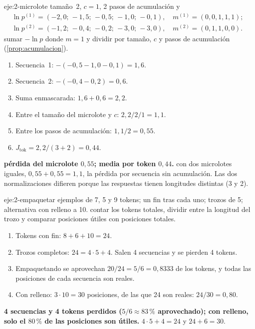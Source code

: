 \begin{solucion}{eje:2-microlote}
\datos tamaño~2, $c=1$, 2 pasos de acumulación y
\begin{gather*}
\ln p^{(1)}=(-2{,}0;\,-1{,}5;\,-0{,}5;\,-1{,}0;\,-0{,}1),\quad m^{(1)}=(0,0,1,1,1);\\
\ln p^{(2)}=(-1{,}2;\,-0{,}4;\,-0{,}2;\,-3{,}0;\,-3{,}0),\quad m^{(2)}=(0,1,1,0,0).
\end{gather*}
\planteamiento sumar $-\ln p$ donde $m=1$ y dividir por tamaño, $c$ y pasos de acumulación (\cref{prop:acumulacion}).
\pasos
\begin{enumerate}[label=\arabic*.]
  \item Secuencia~1: $-(-0{,}5-1{,}0-0{,}1)=1{,}6$.
  \item Secuencia~2: $-(-0{,}4-0{,}2)=0{,}6$.
  \item Suma enmascarada: $1{,}6+0{,}6=2{,}2$.
  \item Entre el tamaño del microlote y $c$: $2{,}2/2/1=1{,}1$.
  \item Entre los pasos de acumulación: $1{,}1/2=0{,}55$.
  \item $J_{\mathrm{tok}}=2{,}2/(3+2)=0{,}44$.
\end{enumerate}
\resultado \textbf{pérdida del microlote $0{,}55$; media por token $0{,}44$.}
\comprobacion con dos microlotes iguales, $0{,}55+0{,}55=1{,}1$, la pérdida por secuencia sin acumulación. Las dos normalizaciones difieren porque las respuestas tienen longitudes distintas (3 y 2).
\end{solucion}

\begin{solucion}{eje:2-empaquetar}
\datos ejemplos de 7, 5 y 9 tokens; un fin tras cada uno; trozos de 5; alternativa con relleno a 10.
\planteamiento contar los tokens totales, dividir entre la longitud del trozo y comparar posiciones útiles con posiciones totales.
\pasos
\begin{enumerate}[label=\arabic*.]
  \item Tokens con fin: $8+6+10=24$.
  \item Trozos completos: $24=4\cdot 5+4$. Salen 4 secuencias y se pierden 4 tokens.
  \item Empaquetando se aprovechan $20/24=5/6=0{,}8333$ de los tokens, y todas las posiciones de cada secuencia son reales.
  \item Con relleno: $3\cdot 10=30$ posiciones, de las que 24 son reales: $24/30=0{,}80$.
\end{enumerate}
\resultado \textbf{4 secuencias y 4 tokens perdidos ($5/6\approx 83\,\%$ aprovechado); con relleno, solo el $80\,\%$ de las posiciones son útiles.}
\comprobacion $4\cdot 5+4=24$ y $24+6=30$.
\end{solucion}

